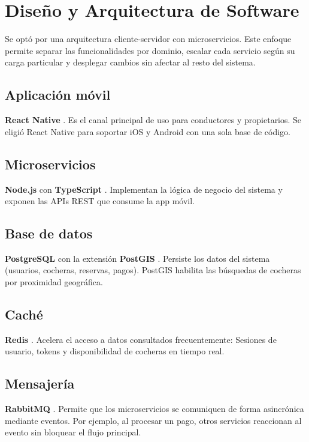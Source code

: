 \section{Diseño y Arquitectura de Software}

Se optó por una arquitectura cliente-servidor con microservicios. Este enfoque permite separar las funcionalidades por dominio, escalar cada servicio según su carga particular y desplegar cambios sin afectar al resto del sistema.

\subsection{Aplicación móvil}
\textbf{React Native} \autocite{reactnative}. Es el canal principal de uso para conductores y propietarios. Se eligió React Native para soportar iOS y Android con una sola base de código.

\subsection{Microservicios}
\textbf{Node.js} \autocite{nodejs} con \textbf{TypeScript} \autocite{typescript}. Implementan la lógica de negocio del sistema y exponen las APIs REST que consume la app móvil.

\subsection{Base de datos}
\textbf{PostgreSQL} \autocite{postgresql} con la extensión \textbf{PostGIS} \autocite{postgis}. Persiste los datos del sistema (usuarios, cocheras, reservas, pagos). PostGIS habilita las búsquedas de cocheras por proximidad geográfica.

\subsection{Caché}
\textbf{Redis} \autocite{redis}. Acelera el acceso a datos consultados frecuentemente: Sesiones de usuario, tokens y disponibilidad de cocheras en tiempo real.

\subsection{Mensajería}
\textbf{RabbitMQ} \autocite{rabbitmq}. Permite que los microservicios se comuniquen de forma asincrónica mediante eventos. Por ejemplo, al procesar un pago, otros servicios reaccionan al evento sin bloquear el flujo principal.

